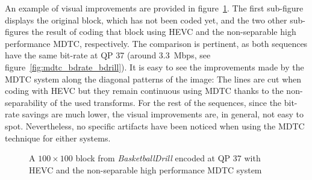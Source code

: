 \documentclass[11pt,a4paper,openright,twoside]{book}
\numberwithin{equation}{section} %
\numberwithin{figure}{section} %
\numberwithin{table}{section} %
\begin{document}
An example of visual improvements are provided in
figure~\ref{fig:mdtc_bdrill_visual}.
The first sub-figure displays the original block, which has not been coded
yet, and the two other sub-figures the result of coding that block using
\ac{HEVC} and the non-separable high performance \ac{MDTC}, respectively.
The comparison is pertinent, as both sequences have the same bit-rate at
\ac{QP} 37 (around \SI{3.3}{\mega bps}, see
figure~\ref{fig:mdtc_bdrate_bdrill}).
It is easy to see the improvements made by the \ac{MDTC} system along the
diagonal patterns of the image:
The lines are cut when coding with \ac{HEVC} but they remain continuous using
\ac{MDTC} thanks to the non-separability of the used transforms.
For the rest of the sequences, since the bit-rate savings are much lower, the
visual improvements are, in general,  not easy to spot.
Nevertheless, no specific artifacts have been noticed when using the \ac{MDTC}
technique for either systems.

\begin{figure}[tb]
	\centering
	\hfill
	\hfill
	\caption[Example of a $100\times100$ block from \emph{BasketballDrill}
	coded at \acs{QP} 37]
	{A $100\times100$ block from \emph{BasketballDrill} encoded at \acs{QP} 37
	with \acs{HEVC} and the non-separable high performance \acs{MDTC} system}
	\label{fig:mdtc_bdrill_visual}
\end{figure}
\end{document}
